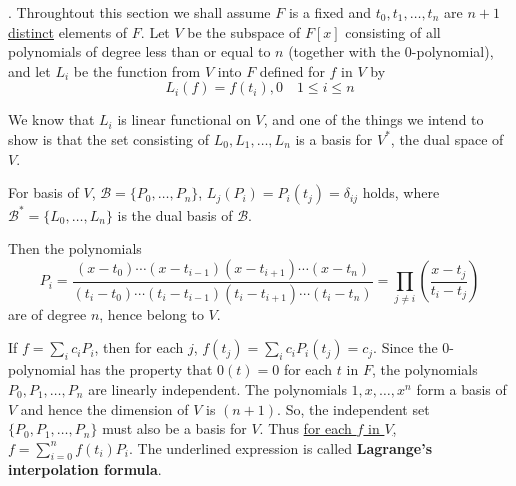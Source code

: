 \documentclass[8pt]{beamer}
\newcommand{\mc}[1]{\mathcal{#1}}
\newcommand{\tb}[1]{\textbf{#1}}
\begin{document}
\begin{frame}{.}
    Throughtout this section we shall assume $F$ is a fixed and $t_0, t_1, \dots, t_n$ are $n +1$ \underline{distinct} elements of $F$.
    Let $V$ be the subspace of $F[x]$ consisting of all polynomials of degree less than or equal to $n$ (together with the $0$-polynomial), and let $L_i$ be the function from $V$ into $F$ defined for $f$ in $V$ by
    \[L_i(f) = f(t_i), 0 \quad 1 \leq i \leq n\]

    We know that $L_i$ is linear functional on $V$, and one of the things we intend to show is that the set consisting of $L_0, L_1, \dots, L_n$ is a basis for $V^\ast$, the dual space of $V$.

    For basis of $V$, $\mc{B} = \{P_0, \dots, P_n\}$,
    $L_j(P_i) = P_i(t_j) = \delta_{ij}$ holds, where $\mc{B}^\ast = \{L_0, \dots, L_n\}$ is the dual basis of $\mc{B}$.

    Then the polynomials
    \[
        P_i = \frac{(x-t_0)\cdots (x- t_{i-1})(x - t_{i+1})\cdots (x-t_n)}{(t_i - t_0)\cdots(t_i - t_{i-1})(t_i - t_{i+1})\cdots (t_i - t_n)} = \prod_{j\neq i} \left(\frac{x - t_j}{t_i - t_j}\right)
    \]
    are of degree $n$, hence belong to $V$.

    If $f = \sum_i c_i P_i$, then for each $j$,  $f(t_j) = \sum_i c_i P_i(t_j) = c_j$.
    Since the $0$-polynomial has the property that $0(t) =0$ for each $t$ in $F$, the polynomials $P_0, P_1, \dots, P_n$ are linearly independent.
    The polynomials $1, x, \dots, x^n$ form a basis of $V$ and hence the dimension of $V$ is $(n+1)$.
    So, the independent set $\{P_0, P_1,\dots, P_n\}$ must also be a basis for $V$.
    Thus \underline{for each $f$ in $V$, $f = \sum_{i=0}^n f(t_i) P_i$}.
    The underlined expression is called \tb{Lagrange's interpolation formula}.
\end{frame}
\end{document}
